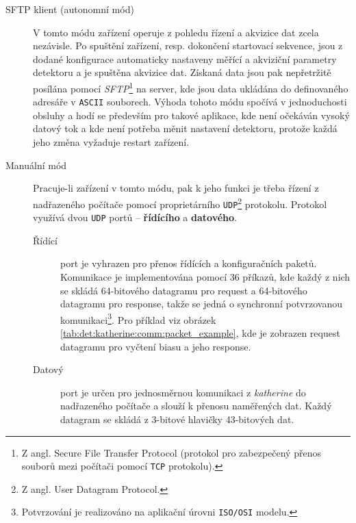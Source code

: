 \begin{description}
	\item [SFTP klient (autonomní mód)] V tomto módu zařízení operuje z pohledu řízení a akvizice dat zcela nezávisle. Po spuštění zařízení, resp. dokončení startovací sekvence, jsou z dodané konfigurace automaticky nastaveny měřící a akviziční parametry detektoru a je spuštěna akvizice dat. Získaná data jsou pak nepřetržitě posílána pomocí \textit{SFTP}\footnote{Z angl. Secure File Transfer Protocol (protokol pro zabezpečený přenos souborů mezi počítači pomocí \texttt{TCP} protokolu).} na server, kde jsou data ukládána do definovaného adresáře v \texttt{ASCII} souborech. Výhoda tohoto módu spočívá v jednoduchosti obsluhy a hodí se především pro takové aplikace, kde není očekáván vysoký datový tok a kde není potřeba měnit nastavení detektoru, protože každá jeho změna vyžaduje restart zařízení.
	
	\item [Manuální mód] Pracuje-li zařízení v tomto módu, pak k jeho funkci je třeba řízení z nadřazeného počítače pomocí proprietárního \texttt{UDP}\footnote{Z angl. User Datagram Protocol.} protokolu. Protokol využívá dvou \texttt{UDP} portů -- \textbf{řídícího} a \textbf{datového}.

	\begin{description}
		\item [Řídící] port je vyhrazen pro přenos řídících a konfiguračních paketů. Komunikace je implementována pomocí $36$ příkazů, kde každý z nich se skládá 64-bitového datagramu pro request a 64-bitového datagramu pro response, takže se jedná o synchronní potvrzovanou komunikaci\footnote{Potvrzování je realizováno na aplikační úrovni \texttt{ISO/OSI} modelu.}. Pro příklad viz obrázek \ref{tab:det:katherine:comm:packet_example}, kde je zobrazen request datagramu pro vyčtení biasu a jeho response.
		
		\item [Datový] port je určen pro jednosměrnou komunikaci z \textit{katherine} do nadřazeného počítače a slouží k přenosu naměřených dat. Každý datagram se skládá z 3-bitové hlavičky 43-bitových dat.
	\end{description}
	
\end{description}

